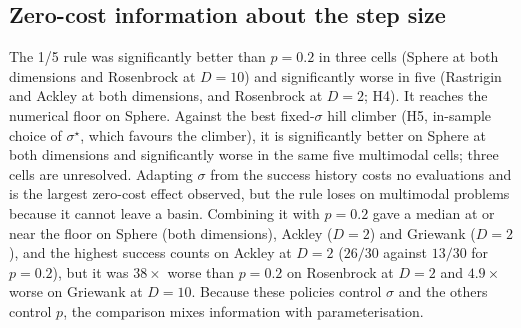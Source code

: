 \documentclass[conference]{IEEEtran}
\begin{document}
\subsection{Zero-cost information about the step size}
The 1/5 rule was significantly better than $p=0.2$ in three cells (Sphere at both dimensions and Rosenbrock at $D=10$) and significantly worse in five (Rastrigin and Ackley at both dimensions, and Rosenbrock at $D=2$; H4). It reaches the numerical floor on Sphere. Against the best fixed-$\sigma$ hill climber (H5, in-sample choice of $\sigma^\star$, which favours the climber), it is significantly better on Sphere at both dimensions and significantly worse in the same five multimodal cells; three cells are unresolved. Adapting $\sigma$ from the success history costs no evaluations and is the largest zero-cost effect observed, but the rule loses on multimodal problems because it cannot leave a basin. Combining it with $p=0.2$ gave a median at or near the floor on Sphere (both dimensions), Ackley ($D=2$) and Griewank ($D=2$), and the highest success counts on Ackley at $D=2$ ($26/30$ against $13/30$ for $p=0.2$), but it was $38\times$ worse than $p=0.2$ on Rosenbrock at $D=2$ and $4.9\times$ worse on Griewank at $D=10$. Because these policies control $\sigma$ and the others control $p$, the comparison mixes information with parameterisation.
\end{document}
